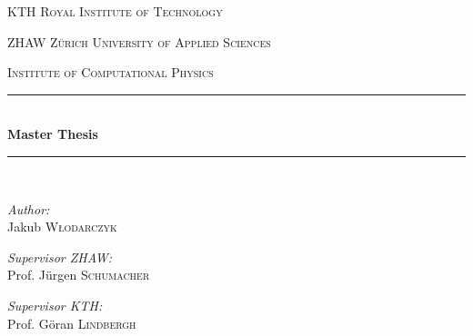 \begin{titlepage}
\newcommand{\HRule}{\rule{\linewidth}{0.5mm}} %

\center %
 

\textsc{\LARGE KTH Royal Institute of Technology}\\[1cm] %
\begin{spacing}{1.5}
\textsc{\LARGE ZHAW Z\"urich University of Applied Sciences}\\[0.5cm] %
\end{spacing}
\textsc{\Large Institute of Computational Physics}\\[0.5cm] %




\HRule \\[0.4cm]
{ \Huge  \bfseries Master Thesis }\\[0.1cm] %
\HRule \\[1cm]
 

\begin{minipage}[b]{0.3\textwidth}
	\large
	\emph{Author:}\\
	Jakub \textsc{Włodarczyk} %
\end{minipage}
\begin{minipage}[b]{0.35\textwidth}
	\large
	\emph{Supervisor ZHAW:} \\
	Prof. J\"urgen \textsc{Schumacher} %
\end{minipage}
\begin{minipage}[b]{0.3\textwidth}
	\large
	\emph{Supervisor KTH:} \\
	Prof. G\"oran \textsc{Lindbergh} %
\end{minipage}\\[2cm]


\end{titlepage}
